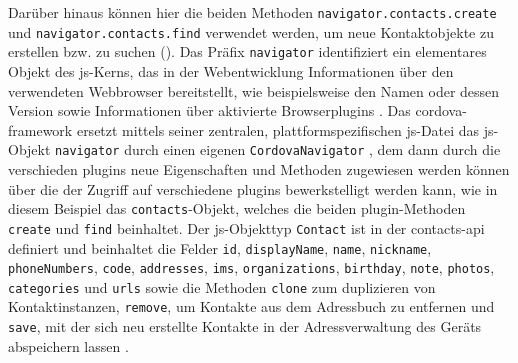 {Darüber hinaus können hier die beiden Methoden \lstinline|navigator.contacts.create| und \lstinline|navigator.contacts.find| verwendet werden, um neue Kontaktobjekte zu erstellen bzw. zu suchen ().
Das Präfix \lstinline|navigator| identifiziert ein elementares Objekt des \gls{js}-Kerns, das in der Webentwicklung Informationen über den verwendeten Webbrowser bereitstellt, wie beispielsweise den Namen oder dessen Version sowie Informationen über aktivierte Browserplugins \cite{selfhtml_navigator}.
Das \gls{cordova}-\gls{framework} ersetzt mittels seiner zentralen, plattformspezifischen \gls{js}-Datei  das \gls{js}-Objekt \lstinline|navigator| durch einen eigenen \lstinline|CordovaNavigator| \cite{cordova.js_replaceNavigator}, dem dann durch die verschieden \glspl{plugin} neue Eigenschaften und Methoden zugewiesen werden können über die der Zugriff auf verschiedene \glspl{plugin} bewerkstelligt werden kann, wie in diesem Beispiel das \lstinline|contacts|-Objekt, welches die beiden \gls{plugin}-Methoden \lstinline|create| und \lstinline|find| beinhaltet.
Der \og \gls{js}-Objekttyp \lstinline|Contact| ist in der \gls{contacts-api} definiert und beinhaltet die Felder \mbox{\lstinline|id|,} \mbox{\lstinline|displayName|,} \mbox{\lstinline|name|,} \mbox{\lstinline|nickname|,} \mbox{\lstinline|phoneNumbers|,} \mbox{\lstinline|code|,} \mbox{\lstinline|addresses|,} \mbox{\lstinline|ims|,} \mbox{\lstinline|organizations|,} \mbox{\lstinline|birthday|,} \mbox{\lstinline|note|,} \mbox{\lstinline|photos|,} \lstinline|categories| und \lstinline|urls| sowie die Methoden \lstinline|clone| zum duplizieren von Kontaktinstanzen, \mbox{\lstinline|remove|,} um Kontakte aus dem Adressbuch zu entfernen und \mbox{\lstinline|save|,} mit der sich neu erstellte Kontakte in der Adressverwaltung des Geräts abspeichern lassen \cite{cordova-plugin-contacts}.

}
